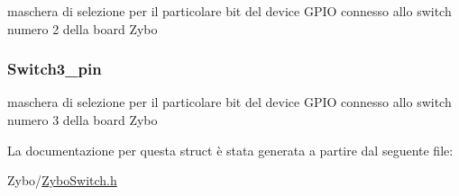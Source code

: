 maschera di selezione per il particolare bit del device G\+P\+I\+O connesso allo switch numero 2 della board Zybo \hypertarget{struct_zybo_switch__t_a6b95420b88fe8c1fd7f347ce3ae1906b}{
\subsubsection[{Switch3\+\_\+pin}]{ Switch3\+\_\+pin}}\label{struct_zybo_switch__t_a6b95420b88fe8c1fd7f347ce3ae1906b}
maschera di selezione per il particolare bit del device G\+P\+I\+O connesso allo switch numero 3 della board Zybo 

La documentazione per questa struct è stata generata a partire dal seguente file\+:\begin{DoxyCompactItemize}
\item 
Zybo/\hyperlink{_zybo_switch_8h}{Zybo\+Switch.\+h}\end{DoxyCompactItemize}
